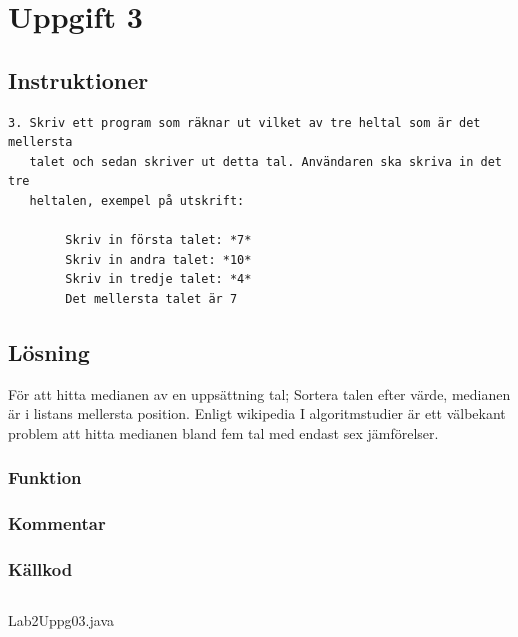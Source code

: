 \section{Uppgift 3}\label{sec:uppg03}

\subsection{Instruktioner}
\begin{verbatim}
3. Skriv ett program som räknar ut vilket av tre heltal som är det mellersta
   talet och sedan skriver ut detta tal. Användaren ska skriva in det tre
   heltalen, exempel på utskrift:

        Skriv in första talet: *7*
        Skriv in andra talet: *10*
        Skriv in tredje talet: *4*
        Det mellersta talet är 7
\end{verbatim}

\subsection{Lösning}
För att hitta medianen av en uppsättning tal;
Sortera talen efter värde, medianen är i listans mellersta position.
Enligt wikipedia 
I algoritmstudier är ett välbekant problem att hitta medianen bland fem tal med
endast sex jämförelser.

%
%
%
\subsubsection{Funktion}

\subsubsection{Kommentar}


\subsubsection{Källkod}
\inputminted[linenos]{java}{src/Lab2Uppg03.java}
\caption{Lab2Uppg03.java}
\label{src:uppg03}


